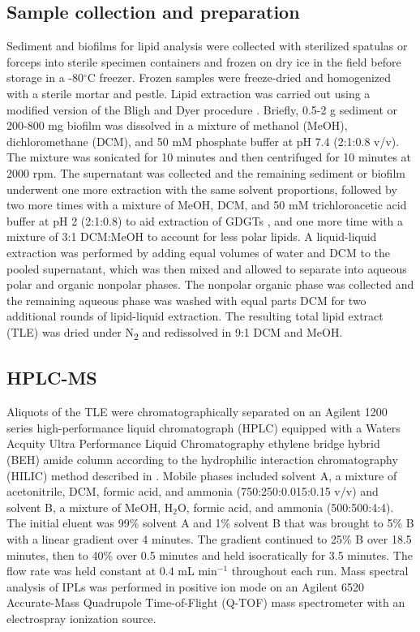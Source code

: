 \subsection{Sample collection and preparation} Sediment and biofilms for lipid analysis were collected with sterilized spatulas or forceps into sterile specimen containers and frozen on dry ice in the field before storage in a -80$^{\circ}$C freezer. Frozen samples were freeze-dried and homogenized with a sterile mortar and pestle. Lipid extraction was carried out using a modified version of the Bligh and Dyer procedure \citep{white1998signature}. Briefly, 0.5-2 g sediment or 200-800 mg biofilm was dissolved in a mixture of methanol (MeOH), dichloromethane (DCM), and 50 mM phosphate buffer at pH 7.4 (2:1:0.8 v/v). The mixture was sonicated for 10 minutes and then centrifuged for 10 minutes at 2000 rpm. The supernatant was collected and the remaining sediment or biofilm underwent one more extraction with the same solvent proportions, followed by two more times with a mixture of MeOH, DCM, and 50 mM trichloroacetic acid buffer at pH 2 (2:1:0.8) to aid extraction of GDGTs \citep{nishihara1987extraction}, and one more time with a mixture of 3:1 DCM:MeOH to account for less polar lipids. A liquid-liquid extraction was performed by adding equal volumes of water and DCM to the pooled supernatant, which was then mixed and allowed to separate into aqueous polar and organic nonpolar phases. The nonpolar organic phase was collected and the remaining aqueous phase was washed with equal parts DCM for two additional rounds of lipid-liquid extraction. The resulting total lipid extract (TLE) was dried under N\textsubscript{2} and redissolved in 9:1 DCM and MeOH.

\subsection{HPLC-MS} Aliquots of the TLE were chromatographically separated on an Agilent 1200 series high-performance liquid chromatograph (HPLC) equipped with a Waters Acquity Ultra Performance Liquid Chromatography ethylene bridge hybrid (BEH) amide column according to the hydrophilic interaction chromatography (HILIC) method described in \cite{wormer2013application}. Mobile phases included solvent A, a mixture of acetonitrile, DCM, formic acid, and ammonia (750:250:0.015:0.15 v/v) and solvent B, a mixture of MeOH, H$_{2}$O, formic acid, and ammonia (500:500:4:4). The initial eluent was 99\% solvent A and 1\% solvent B that was brought to 5\% B with a linear gradient over 4 minutes. The gradient continued to 25\% B over 18.5 minutes, then to 40\% over 0.5 minutes and held isocratically for 3.5 minutes. The flow rate was held constant at 0.4 mL min$^{-1}$ throughout each run. Mass spectral analysis of IPLs was performed in positive ion mode on an Agilent 6520 Accurate-Mass Quadrupole Time-of-Flight (Q-TOF) mass spectrometer with an electrospray ionization source.

